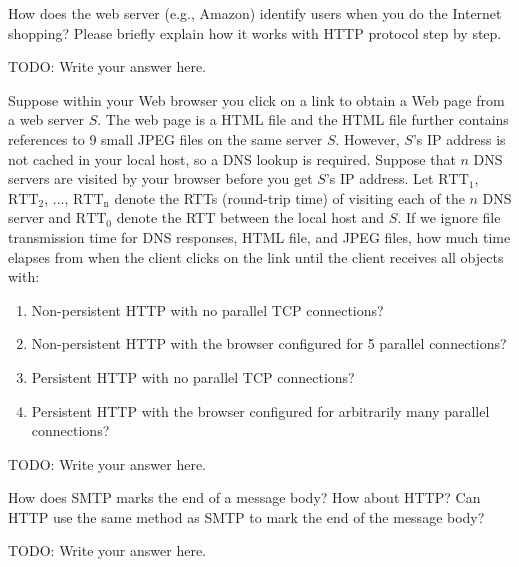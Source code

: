 \documentclass{report}
\begin{document}
\mktitle


\begin{problem}

How does the web server (e.g., Amazon) identify users when you do the Internet shopping?
Please briefly explain how it works with HTTP protocol step by step.

 \medskip
 \begin{answer}{45em}
 	TODO: Write your answer here.
  \end{answer}

\end{problem}

%
\newpage
\begin{problem}

Suppose within your Web browser you click on a link to obtain a Web page from a web server $S$.
The web page is a HTML file and the HTML file further contains references to 9 small JPEG files on the same server $S$.
However, $S$'s IP address is not cached in your local host, so a DNS lookup is required.
Suppose that $n$ DNS servers are visited by your browser before you get $S$'s IP address.
Let $\mathrm{RTT_1}$, $\mathrm{RTT_2}$, ..., $\mathrm{RTT_n}$ denote the RTTs (round-trip time) of visiting each of the $n$ DNS server and $\mathrm{RTT_0}$ denote the RTT between the local host and $S$.
If we ignore file transmission time for DNS responses, HTML file, and JPEG files, how much time elapses from when the client clicks on the link until the client receives all objects with:

\begin{enumerate}
\item Non-persistent HTTP with no parallel TCP connections?
\item Non-persistent HTTP with the browser configured for 5 parallel connections?
\item Persistent HTTP with no parallel TCP connections?
\item Persistent HTTP with the browser configured for arbitrarily many parallel connections?
\end{enumerate}

\begin{answer}{40em}
	TODO: Write your answer here.
\end{answer}

\end{problem}
%

\newpage
\begin{problem}

How does SMTP marks the end of a message body? How about HTTP? Can HTTP use the same method as SMTP to mark the end of the message body?

\medskip
\begin{answer}{40em}
	TODO: Write your answer here.
\end{answer}

\end{problem}
\end{document}
